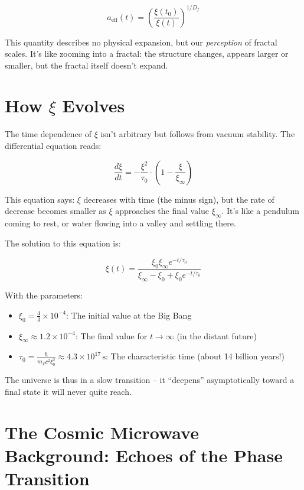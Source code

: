 \documentclass[12pt,a4paper]{article}
\begin{document}
\begin{equation}
a_{\text{eff}}(t) = \left(\frac{\xi(t_0)}{\xi(t)}\right)^{1/D_f}
\end{equation}

This quantity describes no physical expansion, but our \textit{perception} of fractal scales. It's like zooming into a fractal: the structure changes, appears larger or smaller, but the fractal itself doesn't expand.

\section{How $\xi$ Evolves}

The time dependence of $\xi$ isn't arbitrary but follows from vacuum stability. The differential equation reads:

\begin{equation}
\frac{d\xi}{dt} = -\frac{\xi^2}{\tau_0} \cdot \left(1 - \frac{\xi}{\xi_{\infty}}\right)
\end{equation}

This equation says: $\xi$ decreases with time (the minus sign), but the rate of decrease becomes smaller as $\xi$ approaches the final value $\xi_{\infty}$. It's like a pendulum coming to rest, or water flowing into a valley and settling there.

The solution to this equation is:

\begin{equation}
\xi(t) = \frac{\xi_0 \xi_{\infty} e^{-t/\tau_0}}{\xi_{\infty} - \xi_0 + \xi_0 e^{-t/\tau_0}}
\end{equation}

With the parameters:
\begin{itemize}[leftmargin=*]
\item $\xi_0 = \frac{4}{3} \times 10^{-4}$: The initial value at the Big Bang
\item $\xi_{\infty} \approx 1.2 \times 10^{-4}$: The final value for $t \to \infty$ (in the distant future)
\item $\tau_0 = \frac{\hbar}{m_P c^2 \xi_0^2} \approx 4.3 \times 10^{17} \, \text{s}$: The characteristic time (about 14 billion years!)
\end{itemize}

The universe is thus in a slow transition -- it ``deepens'' asymptotically toward a final state it will never quite reach.

\section{The Cosmic Microwave Background: Echoes of the Phase Transition}
\end{document}
